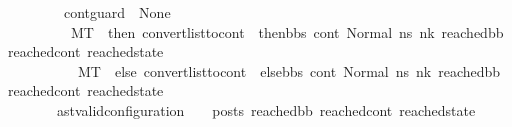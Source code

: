 \begin{isabellebody}
\ \ \ \ \ \ \ \ {\isacharparenleft}{\kern0pt}\ {\isacharparenleft}{\kern0pt}cont{\isacharunderscore}{\kern0pt}guard\ {\isacharequal}{\kern0pt}\ None{\isacharparenright}{\kern0pt}\ {\isasymand}\ \isanewline
\ \ \ \ \ \ \ \ \ \ {\isacharparenleft}{\kern0pt}{\isacharparenleft}{\kern0pt}M{\isacharcomma}{\kern0pt}{\isasymLambda}{\isacharcomma}{\kern0pt}{\isasymGamma}{\isacharcomma}{\kern0pt}{\isasymOmega}{\isacharcomma}{\kern0pt}T\ {\isasymturnstile}\ {\isacharparenleft}{\kern0pt}then{}{\isacharcomma}{\kern0pt}\ convert{\isacharunderscore}{\kern0pt}list{\isacharunderscore}{\kern0pt}to{\isacharunderscore}{\kern0pt}cont\ {\isacharparenleft}{\kern0pt}\ then{\isacharunderscore}{\kern0pt}bbs{\isacharparenright}{\kern0pt}\ cont{}{\isacharcomma}{\kern0pt}\ {\isacharparenleft}{\kern0pt}Normal\ ns{}{\isacharprime}{\kern0pt}{\isacharprime}{\kern0pt}{\isacharparenright}{\kern0pt}{\isacharparenright}{\kern0pt}\ {\isacharminus}{\kern0pt}n{\isasymlongrightarrow}{\isacharcircum}{\kern0pt}k\ {\isacharparenleft}{\kern0pt}reached{\isacharunderscore}{\kern0pt}bb{\isacharcomma}{\kern0pt}\ reached{\isacharunderscore}{\kern0pt}cont{\isacharcomma}{\kern0pt}\ reached{\isacharunderscore}{\kern0pt}state{\isacharparenright}{\kern0pt}{\isacharparenright}{\kern0pt}\ {\isasymor}\isanewline
\ \ \ \ \ \ \ \ \ \ \ {\isacharparenleft}{\kern0pt}M{\isacharcomma}{\kern0pt}{\isasymLambda}{\isacharcomma}{\kern0pt}{\isasymGamma}{\isacharcomma}{\kern0pt}{\isasymOmega}{\isacharcomma}{\kern0pt}T\ {\isasymturnstile}\ {\isacharparenleft}{\kern0pt}else{}{\isacharcomma}{\kern0pt}\ convert{\isacharunderscore}{\kern0pt}list{\isacharunderscore}{\kern0pt}to{\isacharunderscore}{\kern0pt}cont\ {\isacharparenleft}{\kern0pt}\ else{\isacharunderscore}{\kern0pt}bbs{\isacharparenright}{\kern0pt}\ cont{}{\isacharcomma}{\kern0pt}\ {\isacharparenleft}{\kern0pt}Normal\ ns{}{\isacharprime}{\kern0pt}{\isacharprime}{\kern0pt}{\isacharparenright}{\kern0pt}{\isacharparenright}{\kern0pt}\ {\isacharminus}{\kern0pt}n{\isasymlongrightarrow}{\isacharcircum}{\kern0pt}k\ {\isacharparenleft}{\kern0pt}reached{\isacharunderscore}{\kern0pt}bb{\isacharcomma}{\kern0pt}\ reached{\isacharunderscore}{\kern0pt}cont{\isacharcomma}{\kern0pt}\ reached{\isacharunderscore}{\kern0pt}state{\isacharparenright}{\kern0pt}{\isacharparenright}{\kern0pt}\ {\isacharparenright}{\kern0pt}\ {\isacharparenright}{\kern0pt}\ {\isasymLongrightarrow}\ \ \isanewline
\ \ \ \ \ \ \ \ {\isacharparenleft}{\kern0pt}ast{\isacharunderscore}{\kern0pt}valid{\isacharunderscore}{\kern0pt}configuration\ {\isasymLambda}\ {\isasymGamma}\ {\isasymOmega}\ posts\ reached{\isacharunderscore}{\kern0pt}bb\ reached{\isacharunderscore}{\kern0pt}cont\ reached{\isacharunderscore}{\kern0pt}state{\isacharparenright}{\kern0pt}{\isachardoublequoteclose}\isanewline

\end{isabellebody}
